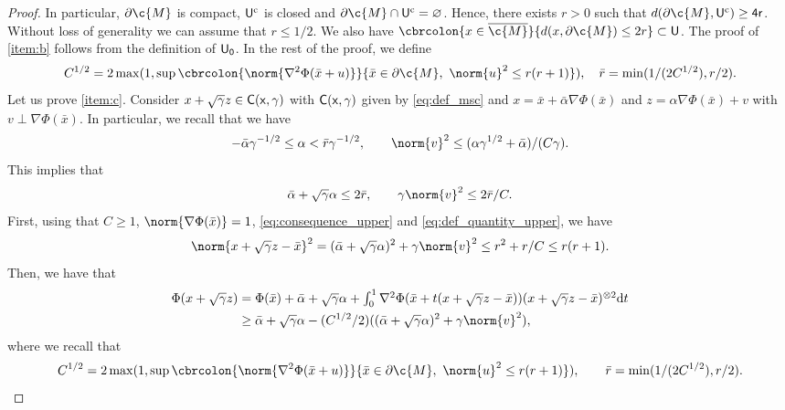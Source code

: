 \begin{proof}
	In particular, $\partial \c{M}$ is compact, $\sf{U}^\mathrm{c}$ is closed and $\partial \c{M} \cap \sf{U}^\mathrm{c} = \emptyset$.
	Hence, there exists $r > 0$ such that $d(\partial \c{M}, \sf{U}^\mathrm{c}) \geq 4r$.
	Without loss of generality we can assume that $r \leq 1/2$.
	We also have $\cbrcolon{x \in \cl{\c{M}}}{d(x, \partial \c{M}) \leq 2r } \subset \sf{U}$.
	The proof of \ref{item:b} follows from the definition of $\sf{U}_0$.
	In the rest of the proof, we define \begin{equation} \label{eq:def_quantity_upper} C^{1/2} = 2\max(1, \sup \cbrcolon{\norm{\nabla^2 \Phi(\bar{x} + u) }}{\bar{x} \in \partial \c{M}, \ \norm{u}^2 \leq r(r+1)}) , \quad \bar{r} = \min(1/(2C^{1/2}), r/2).
	\end{equation}
	Let us prove \ref{item:c}.
	Consider $x + \sqrt{\gamma} z \in \sf{C}(x,\gamma)$ with $\sf{C}(x,\gamma)$ given by \eqref{eq:def_msc} and $x = \bar{x} + \bar{\alpha} \nabla \Phi(\bar{x})$ and $z = \alpha \nabla \Phi(\bar{x}) + v$ with $v \perp \nabla \Phi(\bar{x})$.
	In particular, we recall that we have \begin{equation} -\bar{\alpha}\gamma^{-1/2} \leq \alpha < \bar{r} \gamma^{-1/2} , \qquad \norm{v}^2 \leq ( \alpha \gamma^{1/2} + \bar{\alpha})/(C\gamma) .
	\end{equation}
	This implies that \begin{equation} \label{eq:consequence_upper} \bar{\alpha} + \sqrt{\gamma} \alpha \leq 2 \bar{r} , \qquad \gamma \norm{v}^2 \leq 2 \bar{r} / C .
	\end{equation}
	First, using that $C \geq1$, $\norm{\nabla \Phi(\bar{x})}=1$, \eqref{eq:consequence_upper} and \eqref{eq:def_quantity_upper}, we have \begin{equation} \norm{x+\sqrt{\gamma}z - \bar{x}}^2 = (\bar{\alpha} + \sqrt{\gamma}\alpha)^2 + \gamma \norm{v}^2 \leq r^2 + r/C \leq r(r+1) .
	\end{equation}
	Then, we have that \begin{align} \Phi(x+\sqrt{\gamma}z) &= \textstyle{\Phi(\bar{x}) + \bar{\alpha} + \sqrt{\gamma} \alpha + \int_0^1 \nabla^2 \Phi(\bar{x}+t(x+\sqrt{\gamma}z-\bar{x}))(x+\sqrt{\gamma}z-\bar{x})^{\otimes 2} \mathrm{d} t } \\ & \geq \bar{\alpha} + \sqrt{\gamma} \alpha - (C^{1/2}/2) ((\bar{\alpha} + \sqrt{\gamma} \alpha)^2 + \gamma \norm{v}^2) , \end{align} where we recall that \begin{equation} C^{1/2} = 2\max(1, \sup \cbrcolon{\norm{\nabla^2 \Phi(\bar{x} + u) }}{\bar{x} \in \partial \c{M}, \ \norm{u}^2 \leq r(r+1)}) , \qquad \bar{r} = \min(1/(2C^{1/2}), r/2).

\end{equation}
\end{proof}
